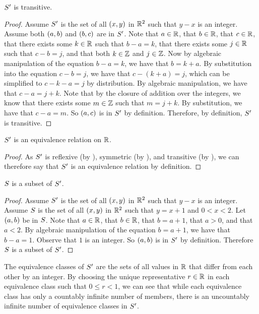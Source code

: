 \documentclass[main.tex]{subfiles}
\begin{document}
\begin{thm}
	\({S'}\) is transitive.
\end{thm}
\begin{proof}
	Assume \({S'}\) is the set of all \(({x},{y})\) in
	\(\mathbb{R} ^ 2\) such that \(y - x\) is an integer. Assume both
	\(({a},{b})\) and \(({b},{c})\) are in \({S'}\). Note
	that \(a \in \mathbb{R}\), that \(b \in \mathbb{R}\), that
	\(c \in \mathbb{R}\), that there exists some \(k \in \mathbb{R}\) such that
	\(b - a = k\), that there exists some \(j \in \mathbb{R}\) such that
	\(c - b = j\), and that both \(k \in \mathbb{Z}\) and
	\(j \in \mathbb{Z}\). Now by algebraic manipulation of the equation
	\(b - a = k\), we have that \(b = k + a\). By substitution into the
	equation \(c - b = j\), we have that \(c - (k + a) = j\), which can be
	simplified to \(c - k - a = j\) by distribution. By algebraic
	manipulation, we have that \(c - a = j + k\). Note that by the closure
	of addition over the integers, we know that there exists some
	\(m \in \mathbb{Z}\) such that \(m = j + k\). By substitution, we have
	that \(c - a = m\). So \(({a},{c})\) is in \({S'}\) by
	definition. Therefore, by definition, \({S'}\) is transitive.
\end{proof}

\begin{thm}
	\({S'}\) is an equivalence relation on \(\mathbb{R}\).
\end{thm}
\begin{proof}
	As \({S'}\) is reflexive (by ), symmetric (by
	), and transitive (by ), we can
	therefore say that  \({S'}\) is an equivalence relation by
	definition.
\end{proof}

\begin{thm}
	\({S}\) is a subset of \({S'}\).
\end{thm}
\begin{proof}
	Assume \({S'}\) is the set of all \(({x},{y})\) in
	\(\mathbb{R} ^ 2\) such that \(y - x\) is an integer. Assume \({S}\)
	is the set of all \(({x},{y})\) in \(\mathbb{R} ^ 2\) such that
	\(y = x + 1\) and \(0 < x < 2\). Let \(({a},{b})\) be in
	\({S}\). Note that \(a \in \mathbb{R}\), that \(b \in \mathbb{R}\),
	that \(b = a + 1\), that \(a > 0\), and that \(a < 2\). By algebraic
	manipulation of the equation \(b = a + 1\), we have that \(b - a = 1\).
	Observe that \(1\) is an integer. So \(({a},{b})\) is in
	\({S'}\) by definition. Therefore \({S}\) is a subset of
	\({S'}\).
\end{proof}

\begin{remark}
	The equivalence classes of \({S'}\) are the sets of all values in
	\(\mathbb{R}\) that differ from each other by an integer. By choosing the
	unique representative \(r \in \mathbb{R}\) in each equivalence class such
	that \(0 \leq r < 1\), we can see that while each equivalence class has
	only a countably infinite number of members, there is an uncountably
	infinite number of equivalence classes in \({S'}\).
\end{remark}
\end{document}
